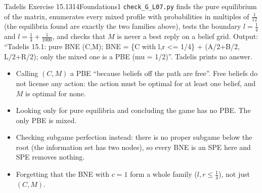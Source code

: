 \begin{exsol}{Tadelis Exercise 15.1}{314}{Foundations}{1}
\verify \texttt{check\_G\_L07.py} finds the pure equilibrium of the matrix, enumerates every mixed
profile with probabilities in multiples of $\frac1{12}$ (the equilibria found are exactly the two families
above), tests the boundary $l = \frac14$ and $l = \frac14 + \frac1{1000}$, and checks that $M$ is never a best
reply on a belief grid. Output: ``Tadelis 15.1: pure BNE (C,M); BNE = \{C with l,r <= 1/4\} +
(A/2+B/2, L/2+R/2); only the mixed one is a PBE (mu = 1/2)''. Tadelis prints no answer.

\mistakes
\begin{itemize}
  \item Calling $(C, M)$ a PBE ``because beliefs off the path are free''. Free beliefs do not license any
  action: the action must be optimal for at least one belief, and $M$ is optimal for none.
  \item Looking only for pure equilibria and concluding the game has no PBE. The only PBE is mixed.
  \item Checking subgame perfection instead: there is no proper subgame below the root (the information
  set has two nodes), so every BNE is an SPE here and SPE removes nothing.
  \item Forgetting that the BNE with $c = 1$ form a whole family ($l, r \le \frac14$), not just $(C, M)$.
\end{itemize}

\end{exsol}
